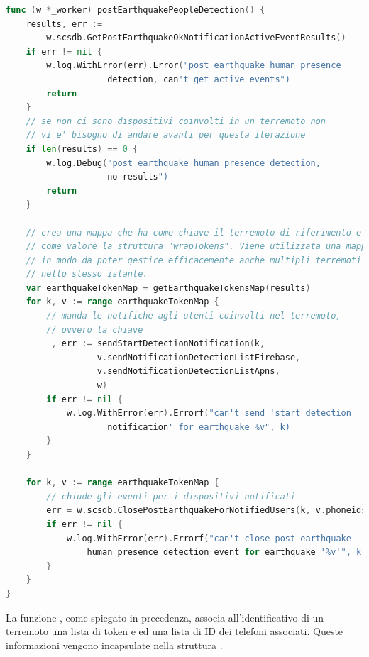 \documentclass[main.tex]{subfiles}
\begin{document}
\begin{lstlisting}[language=go]
func (w *_worker) postEarthquakePeopleDetection() {
    results, err :=      
        w.scsdb.GetPostEarthquakeOkNotificationActiveEventResults()
    if err != nil {
        w.log.WithError(err).Error("post earthquake human presence 
                    detection, can't get active events")
        return
    }
    // se non ci sono dispositivi coinvolti in un terremoto non 
    // vi e' bisogno di andare avanti per questa iterazione
    if len(results) == 0 {
        w.log.Debug("post earthquake human presence detection, 
                    no results")
        return
    }

    // crea una mappa che ha come chiave il terremoto di riferimento e
    // come valore la struttura "wrapTokens". Viene utilizzata una mappa 
    // in modo da poter gestire efficacemente anche multipli terremoti 
    // nello stesso istante.
    var earthquakeTokenMap = getEarthquakeTokensMap(results)
    for k, v := range earthquakeTokenMap {
        // manda le notifiche agli utenti coinvolti nel terremoto,
        // ovvero la chiave
        _, err := sendStartDetectionNotification(k, 
                  v.sendNotificationDetectionListFirebase, 
                  v.sendNotificationDetectionListApns, 
                  w)
        if err != nil {
            w.log.WithError(err).Errorf("can't send 'start detection 
                    notification' for earthquake %v", k)
        }
    }
    
    for k, v := range earthquakeTokenMap {
        // chiude gli eventi per i dispositivi notificati
        err = w.scsdb.ClosePostEarthquakeForNotifiedUsers(k, v.phoneids)
        if err != nil {
            w.log.WithError(err).Errorf("can't close post earthquake 
                human presence detection event for earthquake '%v'", k)
        }
    }
}
\end{lstlisting}
La funzione , come spiegato in precedenza, associa all'identificativo di un terremoto una lista di token  e  ed una lista di ID dei telefoni associati. Queste informazioni vengono incapsulate nella struttura .
\end{document}
